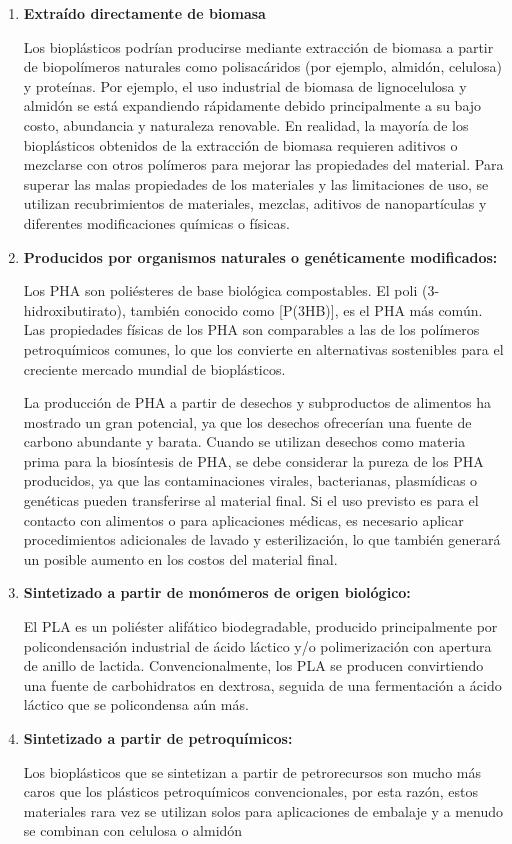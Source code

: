 \documentclass[14pt,oneside]{extarticle} %
\begin{document}
\begin{enumerate}
    \item \textbf{Extraído directamente de biomasa} 

Los bioplásticos podrían producirse mediante extracción de biomasa a partir de biopolímeros naturales como polisacáridos (por ejemplo, almidón, celulosa) y proteínas. Por ejemplo, el uso industrial de biomasa de lignocelulosa y almidón se está expandiendo rápidamente debido principalmente a su bajo costo, abundancia y naturaleza renovable. En realidad, la mayoría de los bioplásticos obtenidos de la extracción de biomasa requieren aditivos o mezclarse con otros polímeros para mejorar las propiedades del material. Para superar las malas propiedades de los materiales y las limitaciones de uso, se utilizan recubrimientos de materiales, mezclas, aditivos de nanopartículas y diferentes modificaciones químicas o físicas. 

    \item \textbf{Producidos por organismos naturales o genéticamente modificados:}

Los PHA son poliésteres de base biológica compostables. El poli (3-hidroxibutirato), también conocido como [P(3HB)], es el PHA más común. Las propiedades físicas de los PHA son comparables a las de los polímeros petroquímicos comunes, lo que los convierte en alternativas sostenibles para el creciente mercado mundial de bioplásticos.

La producción de PHA a partir de desechos y subproductos de alimentos ha mostrado un gran potencial, ya que los desechos ofrecerían una fuente de carbono abundante y barata. Cuando se utilizan desechos como materia prima para la biosíntesis de PHA, se debe considerar la pureza de los PHA producidos, ya que las contaminaciones virales, bacterianas, plasmídicas o genéticas pueden transferirse al material final. Si el uso previsto es para el contacto con alimentos o para aplicaciones médicas, es necesario aplicar procedimientos adicionales de lavado y esterilización, lo que también generará un posible aumento en los costos del material final.

    \newpage
    \item \textbf{Sintetizado a partir de monómeros de origen biológico:}

El PLA es un poliéster alifático biodegradable, producido
principalmente por policondensación industrial de ácido láctico y/o polimerización con apertura de anillo de lactida. Convencionalmente, los PLA se producen convirtiendo una fuente de carbohidratos en dextrosa, seguida de una fermentación a ácido láctico que se policondensa aún más.

    \item \textbf{Sintetizado a partir de petroquímicos:} 

Los bioplásticos que se sintetizan a partir de petrorecursos son mucho más caros que los plásticos  petroquímicos convencionales, por esta razón, estos materiales rara vez se utilizan solos para  aplicaciones de embalaje y a menudo se combinan con celulosa o almidón
\end{enumerate}
\end{document}
